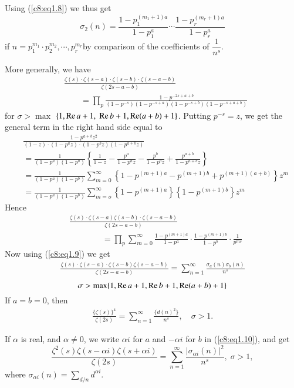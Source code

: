 Using (\ref{c8:eq1.8}) we thus get
\begin{equation*}
\sigma_2(n) = \frac{1-p_1^{(m_1+1)a}}{1-p^a_1} \cdots
\frac{1-p_r^{(m_r + 1)a}}{1-p^a_r}
\tag{1.9}\label{c8:eq1.9}
\end{equation*}
if $n = p^{m_1}_1\cdot p^{m_2}_2, \cdots, p^{m_r}_r$\pageoriginale by
comparison of the coefficients of $\dfrac{1}{n^s}$.

More generally, we have
{\fontsize{10}{12}\selectfont
\begin{align*}
&\frac{\zeta(s) \cdot \zeta(s-a) \cdot \zeta (s-b) \cdot
  \zeta(s-a-b)}{\zeta(2s-a-b)}\\
&\qquad = \prod\limits_p \frac{1 - p^{-2s + a + b}}{(1-p^{-s})
  (1-p^{-s+a})(1-p^{-s+b})(1-p^{-s+a+b})}
\end{align*}}
for $\sigma > \max$ $\{1, \operatorname{Re}  a+1, \; \operatorname{Re} b + 1, \operatorname{Re}
(a+b)+1\}$. Putting $p^{-s} = z$, we get the general term in the right
hand side equal to
\begin{align*}
& \frac{1-p^{a+b} z^2}{(1-z) \cdot (1-p^az) \cdot
    (1-p^bz)(1-p^{a+b} z)}\\
& = \frac{1}{(1-p^a)(1-p^b)} \left\{\frac{1}{1-z} - \frac{p^a}{1-p^az}
  - \frac{p^b}{1-p^bz} + \frac{p^{a+b}}{1-p^{a+b}z}\right\}\\
& = \frac{1}{(1-p^a) (1-p^b)} \sum\limits^\infty_{m=0}
    \left\{1-p^{(m+1)a} - p^{(m+1)b} + p^{(m+1)(a+b)} \right\} z^m \\
& = \frac{1}{(1-p^a) (1-p^b)} \sum\limits^\infty_{m=o} \left\{
    1-p^{(m+1)a}\right\}  \left\{1-p^{(m+1)b} \right\} z^m
\end{align*}
Hence\pageoriginale
\begin{align*}
& \frac{\zeta(s) \cdot \zeta(s-a)\zeta(s-b) \cdot
  \zeta(s-a-b)}{\zeta(2s-a-b)} \\
& \qquad \qquad = \prod\limits_p \sum\limits^\infty_{m=0}
\frac{1-p^{(m+1)a}}{1-p^a}  \cdot \frac{1-p^{(m+1)b}}{1-p^b} \cdot
\frac{1}{p^{ms}}
\end{align*}
Now using (\ref{c8:eq1.9}) we get
\begin{align*}
\frac{\zeta(s) \cdot \zeta (s-a) \cdot \zeta (s-b)
  \zeta(s-a-b)}{\zeta(2s-a-b)} = \sum\limits^\infty_{n=1}
\frac{\sigma_a (n) \sigma_b(n)}{n^s} \tag{1.10}\label{c8:eq1.10}
\end{align*}
$$
\sigma > \max \{1, \operatorname{Re} a+1, \operatorname{Re} b+1, \operatorname{Re} (a+b) +1\}
$$
If $a=b=0$, then
\begin{align*}
\frac{\{\zeta(s)\}^4}{\zeta(2s)} = \sum\limits^\infty_{n=1}
\frac{\{d(n)^2\}}{n^s} , \quad \sigma >1.\tag{1.11}\label{c8:eq1.11}
\end{align*}

If $\alpha$ is real, and $\alpha \neq 0$, we write $\alpha i$ for $a$
and $-\alpha i$ for $b$ in (\ref{c8:eq1.10}), and get
\begin{equation*}
\frac{\zeta^2 (s) \zeta(s-\alpha i) \zeta(s + \alpha i)}{\zeta(2s)} =
\sum\limits^\infty_{n=1} \frac{|\sigma_{\alpha i} (n)|^2}{n^s},\;  \sigma >1, \tag{1.12}\label{c8:eq1.12}
\end{equation*}
where $\sigma_{\alpha i}(n) = \sum\limits_{d/n} d^{\alpha i}$.
